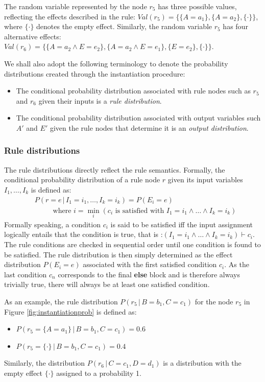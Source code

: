The random variable represented by the node $r_5$ has three possible values, reflecting the effects described in the rule: $\textit{Val}(r_5) = \{ \{A\!=\!a_1\}, \{A\!=\!a_2\}, \{\cdot\}\}$, where $\{\cdot\}$ denotes the empty effect.  Similarly, the random variable $r_5$ has four alternative effects: $\textit{Val}(r_6) = \{\{A\!=\!a_2 \land E\!=\!e_2\}, \{A\!=\!a_2 \land E\!=\!e_1\}, \{E=e_2\}, \{\cdot\}\}$. 

We shall also adopt the following terminology to denote the probability distributions created through the instantiation procedure: 
\begin{itemize}
\item The conditional probability distribution associated with rule nodes such as $r_5$ and $r_6$ given their inputs is a \textit{rule distribution}.
\item The conditional probability distribution associated with output variables such $A'$ and $E'$ given the rule nodes that determine it is an \textit{output distribution}.
\end{itemize}

\subsubsection*{Rule distributions}

The rule distributions directly reflect the rule semantics.  Formally, the conditional probability distribution of a rule node $r$ given its input variables $I_1, \dots, I_k$ is defined as: 
\begin{align}
& P(r\!=\!e \, | \, I_1\!=\!i_1, \dots, I_k\!=\!i_k) = P(E_i = e) \label{eq:ruledistrib}
 \\ 
& \; \; \; \; \; \; \; \; \text{ where } i = \min_i (c_i \text{ is satisfied with } I_1\!=\!i_1 \land \dots \land I_k\!=\!i_k) \nonumber 
\end{align}
Formally speaking, a condition $c_i$ is said to be satisfied iff the input assignment logically entails that the condition is true, that is :$(I_1\!=\!i_1 \land \dots \land I_k\!=\!i_k) \vdash c_i$. The rule conditions are checked in sequential order until one condition is found to be satisfied. The rule distribution is then simply determined as the effect distribution $P(E_i\!=\!e)$ associated with the first satisfied condition $c_i$.  As the last condition $c_n$ corresponds to the final \textbf{else} block and is therefore always trivially true, there will always be at least one satisfied condition. 

As an example, the rule distribution $P(r_5 \, | \, B\!=\!b_1, C\!=\!c_1)$ for the node $r_5$ in Figure \ref{fig:instantiationprob} is defined as:
\begin{itemize}
\item $P(r_5 = \{A\!=\!a_1\} \, | \, B\!=\!b_1, C\!=\!c_1) = 0.6$
\item  $P(r_5 = \{\cdot\} \, | \, B\!=\!b_1, C\!=\!c_1) = 0.4$
\end{itemize}
Similarly, the distribution $P(r_6 \, | \, C\!=\!c_1, D\!=\!d_1)$ is a distribution with the empty effect $\{\cdot\}$ assigned to a probability 1. 

